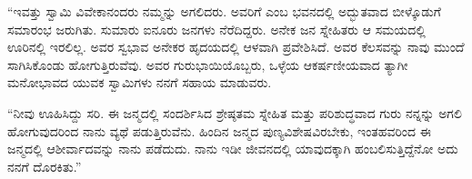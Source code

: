  “ಇವತ್ತು ಸ್ವಾಮಿ ವಿವೇಕಾನಂದರು ನಮ್ಮನ್ನು ಅಗಲಿದರು. ಅವರಿಗೆ  ಎಂಬ ಭವನದಲ್ಲಿ ಅದ್ಭುತವಾದ ಬೀಳ್ಕೊಡುಗೆ ಸಮಾರಂಭ ಜರುಗಿತು. ಸುಮಾರು ಐನೂರು ಜನಗಳು ನೆರೆದಿದ್ದರು. ಅನೇಕ ಜನ ಸ್ನೇಹಿತರು ಆ ಸಮಯದಲ್ಲಿ ಊರಿನಲ್ಲಿ ಇರಲಿಲ್ಲ. ಅವರ ಸ್ವಭಾವ ಅನೇಕರ ಹೃದಯದಲ್ಲಿ ಆಳವಾಗಿ ಪ್ರವೇಶಿಸಿದೆ. ಅವರ ಕೆಲಸವನ್ನು ನಾವು ಮುಂದೆ ಸಾಗಿಸಿಕೊಂಡು ಹೋಗುತ್ತಿರುವೆವು. ಅವರ ಗುರುಭಾಯಿಯೊಬ್ಬರು, ಒಳ್ಳೆಯ ಆಕರ್ಷಣೀಯವಾದ ತ್ಯಾಗೀ ಮನೋಭಾವದ ಯುವಕ ಸ್ವಾಮಿಗಳು ನನಗೆ ಸಹಾಯ ಮಾಡುವರು.

 “ನೀವು ಊಹಿಸಿದ್ದು ಸರಿ. ಈ ಜನ್ಮದಲ್ಲಿ ಸಂದರ್ಶಿಸಿದ ಶ್ರೇಷ್ಠತಮ ಸ್ನೇಹಿತ ಮತ್ತು ಪರಿಶುದ್ಧವಾದ ಗುರು ನನ್ನನ್ನು ಅಗಲಿ ಹೋಗುವುದರಿಂದ ನಾನು ವ್ಯಥೆ ಪಡುತ್ತಿರುವೆನು. ಹಿಂದಿನ ಜನ್ಮದ ಪುಣ್ಯವಿಶೇಷವಿರಬೇಕು, ಇಂತಹವರಿಂದ ಈ ಜನ್ಮದಲ್ಲಿ ಆಶೀರ್ವಾದವನ್ನು ನಾನು ಪಡೆದುದು. ನಾನು ಇಡೀ ಜೀವನದಲ್ಲಿ ಯಾವುದಕ್ಕಾಗಿ ಹಂಬಲಿಸುತ್ತಿದ್ದೆನೋ ಅದು ನನಗೆ ದೊರಕಿತು.”

